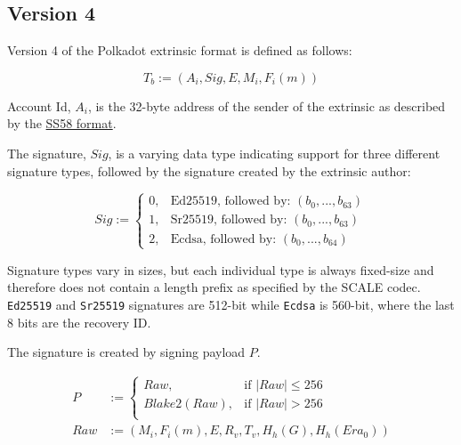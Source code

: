 \subsection{Version 4}

Version 4 of the Polkadot extrinsic format is defined as follows:

\[
    T_b := (A_i, Sig, E, M_i, F_i(m))
\]

\begin{definition}
    Account Id, $A_i$, is the 32-byte address of the sender of the extrinsic as
    described by the
    \href{https://github.com/paritytech/substrate/wiki/External-Address-Format-(SS58)}{SS58
    format}.
\end{definition}

\begin{definition}
    \label{defn-extrinsic-signature}
    The signature, $Sig$, is a varying data type indicating support for three
    different signature types, followed by the signature created by the
    extrinsic author:

    \[
        Sig :=
        \begin{cases}
        0, & \text{Ed25519, followed by: } (b_0, ...,b_{63}) \\
        1, & \text{Sr25519, followed by: } (b_0, ...,b_{63}) \\
        2, & \text{Ecdsa, followed by: } (b_0, ...,b_{64})
        \end{cases}
    \]

    Signature types vary in sizes, but each individual type is always fixed-size
    and therefore does not contain a length prefix as specified by the SCALE
    codec. \verb|Ed25519| and \verb|Sr25519| signatures are 512-bit while
    \verb|Ecdsa| is 560-bit, where the last 8 bits are the recovery ID.
    \newline

    The signature is created by signing payload $P$.

    \begin{equation}
        \begin{aligned}
        P &:= \begin{cases}
            Raw, & \text{if } |Raw| \leq 256\\
            Blake2(Raw), & \text{if } |Raw| > 256\\
        \end{cases}\\
        Raw &:= (M_i, F_i(m), E, R_v, T_v, H_h(G), H_h(Era_0))\\
        \end{aligned}
    \end{equation}


\end{definition}
